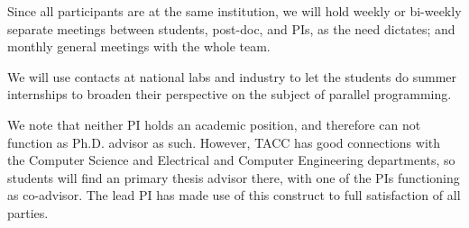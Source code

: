Since all participants are at the same institution, we will hold
weekly or bi-weekly separate meetings between students, post-doc, and PIs, 
as the need dictates; and monthly general meetings
with the whole team.

We will
use contacts at national labs and industry to let the students do
summer internships to broaden their perspective on the subject of
parallel programming.

We note that neither PI holds an academic position, and therefore can not
function as Ph.D. advisor as such. However, TACC has good connections
with the Computer Science and Electrical and Computer Engineering departments,
so students will find an primary thesis advisor there, with one of the PIs
functioning as co-advisor. The lead PI has made use of this construct
to full satisfaction of all parties.

\endinput
